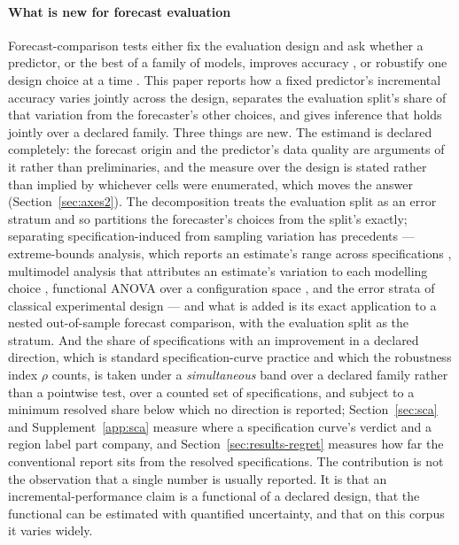 \paragraph{What is new for forecast evaluation}
Forecast-comparison tests either fix the evaluation design and ask whether a
predictor, or the best of a family of models, improves accuracy
\citep{clark2001nested,hansen2005spa,gonzalo2024outofsample}, or robustify
one design choice at a time \citep{rossi2012window,hansen2012sample}. This
paper reports how a fixed predictor's incremental accuracy varies jointly
across the design, separates the evaluation split's share of that variation
from the forecaster's other choices, and gives inference that holds jointly
over a declared family. Three things are
new. The estimand is declared completely: the forecast origin and the
predictor's data quality are arguments of it rather than preliminaries, and
the measure over the design is stated rather than implied by whichever cells
were enumerated, which moves the answer (Section~\ref{sec:axes2}). The
decomposition treats the evaluation split as an error stratum and so
partitions the forecaster's choices from the split's exactly; separating
specification-induced from sampling variation has precedents ---
extreme-bounds analysis, which reports an estimate's range across
specifications \citep{leamer1983con}, multimodel analysis that attributes an
estimate's variation to each modelling choice \citep{young2017model},
functional ANOVA over a configuration space \citep{hutter2014efficient}, and
the error strata of classical experimental design --- and what is added is
its exact application to a nested out-of-sample forecast comparison, with
the evaluation split as the stratum. And the share of specifications with an
improvement in a declared direction, which is standard specification-curve
practice \citep{simonsohn2020specification} and which the robustness index
$\rho$ counts, is taken under a \emph{simultaneous} band over a declared
family rather than a pointwise test, over a counted set of specifications,
and subject to a minimum resolved share below which no direction is reported;
Section~\ref{sec:sca} and Supplement~\ref{app:sca} measure where a
specification curve's verdict and a region label part company, and
Section~\ref{sec:results-regret} measures how far the conventional report
sits from the resolved specifications. The contribution is not the
observation that a single number is usually reported. It is that an
incremental-performance claim is a functional of a declared design, that the
functional can be estimated with quantified uncertainty, and that on this
corpus it varies widely.
